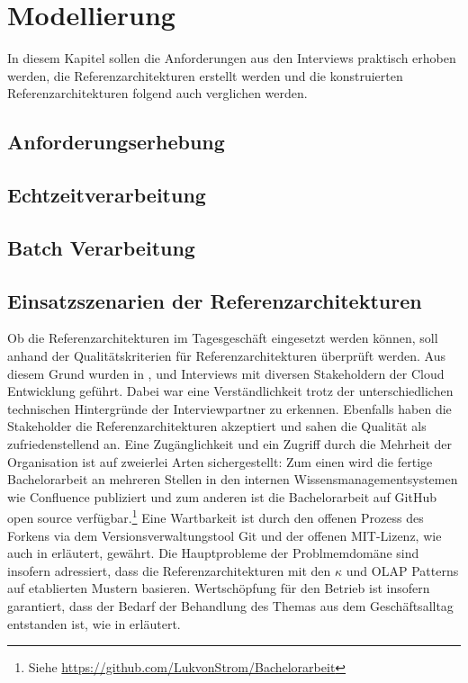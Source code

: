 \chapter{Modellierung}
In diesem Kapitel sollen die Anforderungen aus den Interviews praktisch erhoben werden, die Referenzarchitekturen erstellt werden und die konstruierten Referenzarchitekturen folgend auch verglichen werden.
\section{Anforderungserhebung}


\section{Echtzeitverarbeitung}\label{chap:ra-rt}


\section{Batch Verarbeitung}\label{chap:ra-batch}


\section{Einsatzszenarien der Referenzarchitekturen}
Ob die Referenzarchitekturen im Tagesgeschäft eingesetzt werden können, soll anhand der Qualitätskriterien für Referenzarchitekturen überprüft werden. Aus diesem Grund wurden in  ,  und  Interviews mit diversen Stakeholdern der Cloud Entwicklung geführt. Dabei war eine Verständlichkeit trotz der unterschiedlichen technischen Hintergründe der Interviewpartner zu erkennen. Ebenfalls haben die Stakeholder die Referenzarchitekturen akzeptiert und sahen die Qualität als zufriedenstellend an. Eine Zugänglichkeit und ein Zugriff durch die Mehrheit der Organisation ist auf zweierlei Arten sichergestellt: Zum einen wird die fertige Bachelorarbeit an mehreren Stellen in den internen Wissensmanagementsystemen wie Confluence publiziert und zum anderen ist die Bachelorarbeit auf GitHub open source verfügbar.\footnote{Siehe \url{https://github.com/LukvonStrom/Bachelorarbeit}} Eine Wartbarkeit ist durch den offenen Prozess des Forkens via dem Versionsverwaltungstool Git und der offenen MIT-Lizenz, wie auch in  erläutert, gewährt. Die Hauptprobleme der Problmemdomäne sind insofern adressiert, dass die Referenzarchitekturen mit den $\kappa$ und \ac{OLAP} Patterns auf etablierten Mustern basieren. Wertschöpfung für den Betrieb ist insofern garantiert, dass der Bedarf der Behandlung des Themas aus dem Geschäftsalltag entstanden ist, wie in  erläutert.


